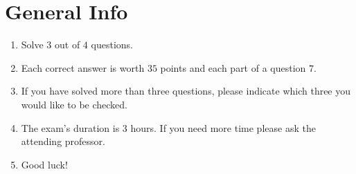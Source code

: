 \documentclass{article}
\begin{document}

\section*{General Info}
\begin{enumerate}
\item Solve $3$ out of $4$ questions.
\item Each correct answer is worth $35$ points and each part of a question $7$.
\item If you have solved more than three questions, please indicate which three you would like to be checked.
\item The exam's duration is 3 hours. If you need more time please ask the attending professor.
\item Good luck!
\end{enumerate}
\end{document}
